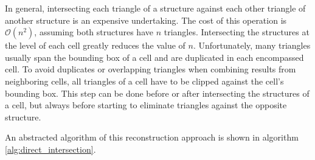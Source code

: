 In general, intersecting each triangle of a structure against each other triangle of another structure is an expensive undertaking.
The cost of this operation is $\mathcal{O}(n^2)$, assuming both structures have $n$ triangles.
Intersecting the structures at the level of each cell greatly reduces the value of $n$.
Unfortunately, many triangles usually span the bounding box of a cell and are duplicated in each encompassed cell.
To avoid duplicates or overlapping triangles when combining results from neighboring cells, all triangles of a cell have to be clipped against the cell's bounding box.
This step can be done before or after intersecting the structures of a cell, but always before starting to eliminate triangles against the opposite structure.

An abstracted algorithm of this reconstruction approach is shown in algorithm \ref{alg:direct_intersection}.

